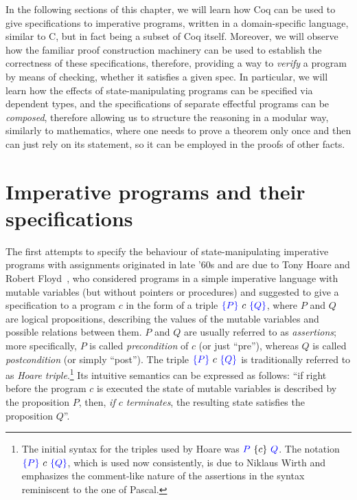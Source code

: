 In the following sections of this chapter, we will learn how Coq can
be used to give specifications to imperative programs, written in a
domain-specific language, similar to C, but in fact being a subset of
Coq itself. Moreover, we will observe how the familiar proof
construction machinery can be used to establish the correctness of
these specifications, therefore, providing a way to \textit{verify} a program
by means of checking, whether it satisfies a given spec. In
particular, we will learn how the effects of state-manipulating
programs can be specified via dependent types, and the specifications
of separate effectful programs can be \textit{composed}, therefore allowing
us to structure the reasoning in a modular way, similarly to
mathematics, where one needs to prove a theorem only once and then can
just rely on its statement, so it can be employed in the proofs of
other facts.


\section{Imperative programs and their specifications \label{sec:imp-spec}}




The first attempts to specify the behaviour of state-manipulating
imperative programs with assignments originated in late '60s and are
due to Tony Hoare and Robert Floyd~\cite{Hoare:CACM69,Floyd:67}, who
considered programs in a simple imperative language with mutable
variables (but without pointers or procedures) and suggested to give a
specification to a program $c$ in the form of a triple
$\textcolor{blue}{\left\{{P}\right\}}~c~\textcolor{blue}{\left\{{Q}\right\}}$, where $P$ and $Q$ are logical propositions,
describing the values of the mutable variables and possible relations
between them. $P$ and $Q$ are usually  referred to
as \textit{assertions}; more specifically, $P$ is called
 \textit{precondition} of $c$ (or
just ``pre''), whereas $Q$ is called \textit{postcondition} (or simply
``post''). The triple $\textcolor{blue}{\left\{{P}\right\}}~c~\textcolor{blue}{\left\{{Q}\right\}}$ is traditionally referred to
as \textit{Hoare triple}.\footnote{The initial syntax
for the triples used by Hoare was $\textcolor{blue}{P}~\{{c}\}~\textcolor{blue}{Q}$. The
notation $\textcolor{blue}{\left\{{P}\right\}}~c~\textcolor{blue}{\left\{{Q}\right\}}$, which is used now consistently, is due
to Niklaus Wirth and emphasizes the comment-like nature of the
assertions in the syntax reminiscent to the one of Pascal.} Its
intuitive semantics can be expressed as follows: \label{pg:triple}
``if right before the program $c$ is executed the state of mutable
variables is described by the proposition $P$, then, \textit{if $c$
terminates}, the resulting state satisfies the proposition $Q$''.



